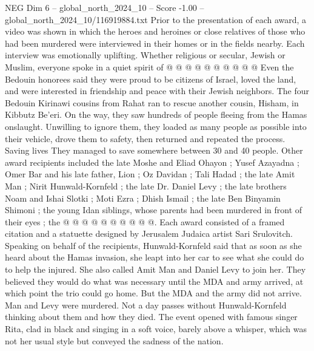 \begin{textsample}{NEG Dim 6 – global\_north\_2024\_10 – Score -1.00 – global\_north\_2024\_10/116919884.txt}
Prior to the presentation of each award, a video was shown in which the heroes and heroines or close relatives of those who had been murdered were interviewed in their homes or in the fields nearby.
Each interview was emotionally uplifting.
Whether religious or secular, Jewish or Muslim, everyone spoke in a quiet spirit of @ @ @ @ @ @ @ @ @ @ Even the Bedouin honorees said they were proud to be citizens of Israel, loved the land, and were interested in friendship and peace with their Jewish neighbors.
The four Bedouin Kirinawi cousins from Rahat ran to rescue another cousin, Hisham, in Kibbutz Be'eri.
On the way, they saw hundreds of people fleeing from the Hamas onslaught.
Unwilling to ignore them, they loaded as many people as possible into their vehicle, drove them to safety, then returned and repeated the process.
Saving lives They managed to save somewhere between 30 and 40 people.
Other award recipients included the late Moshe and Eliad Ohayon ; Yusef Azayadna ; Omer Bar and his late father, Lion ; Oz Davidan ; Tali Hadad ; the late Amit Man ; Nirit Hunwald-Kornfeld ; the late Dr.
Daniel Levy ; the late brothers Noam and Ishai Slotki ; Moti Ezra ; Dhish Ismail ; the late Ben Binyamin Shimoni ; the young Idan siblings, whose parents had been murdered in front of their eyes ; the @ @ @ @ @ @ @ @ @ @.
Each award consisted of a framed citation and a statuette designed by Jerusalem Judaica artist Sari Srulovitch.
Speaking on behalf of the recipients, Hunwald-Kornfeld said that as soon as she heard about the Hamas invasion, she leapt into her car to see what she could do to help the injured.
She also called Amit Man and Daniel Levy to join her.
They believed they would do what was necessary until the MDA and army arrived, at which point the trio could go home.
But the MDA and the army did not arrive.
Man and Levy were murdered.
Not a day passes without Hunwald-Kornfeld thinking about them and how they died.
The event opened with famous singer Rita, clad in black and singing in a soft voice, barely above a whisper, which was not her usual style but conveyed the sadness of the nation.

\end{textsample}
